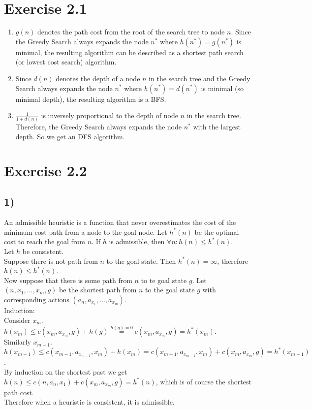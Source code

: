 \documentclass{article}
\begin{document}
\section*{Exercise 2.1}
\begin{enumerate}[label=(\alph*)]
	\item	$g(n)$ denotes the path cost from the root of the search tree to node $n$. Since the Greedy Search always expands the node $n^*$ where $h(n^*) = g(n^*)$ is minimal, the resulting algorithm can be described as a shortest path search (or lowest cost search) algorithm.
	\item	Since $d(n)$ denotes the depth of a node $n$ in the search tree and the Greedy Search always expands the node $n^*$ where $h(n^*) = d(n^*)$ is minimal (so minimal depth), the resulting algorithm is a BFS.
	\item	$\frac{1}{1+d(n)}$ is inversely proportional to the depth of node $n$ in the search tree. Therefore, the Greedy Search always expands the node $n^*$ with the largest depth. So we get an DFS algorithm.
\end{enumerate}

\section*{Exercise 2.2}
\subsection*{1)}
An admissible heuristic is a function that never overestimates the cost of the minimum cost path from a node to the goal node. Let $h^*(n)$ be the optimal cost to reach the goal from $n$. If $h$ is admissible, then $\forall n: h(n) \leq h^*(n)$.\\[2\baselineskip]
Let $h$ be consistent.\\
Suppose there is not path from $n$ to the goal state. Then $h^*(n) = \infty$, therefore $h(n) \leq h^*(n)$.\\
Now suppose that there is some path from $n$ to te goal state $g$. Let $(n, x_1, \dots, x_m, g)$ be the shortest path from $n$ to the goal state $g$ with corresponding actions $(a_n, a_{x_1}, \dots, a_{x_m})$.\\[2\baselineskip]
Induction:\\
Consider $x_m$. $h(x_m) \leq c(x_m, a_{x_m}, g) + h(g) \stackrel{h(g)=0}{=} c(x_m, a_{x_m}, g) = h^*(x_m)$.\\
Similarly $x_{m-1}$. $h(x_{m-1}) \leq c(x_{m-1}, a_{x_{m-1}}, x_m) + h(x_m) = c(x_{m-1}, a_{x_{m-1}}, x_m) + c(x_m, a_{x_m}, g) = h^*(x_{m-1})$.\\
By induction on the shortest past we get $h(n) \leq c(n, a_n, x_1)+ c(x_m, a_{x_m}, g) = h^*(n)$, which is of course the shortest path cost.\\[2\baselineskip]
Therefore when a heuristic is consistent, it is admissible.
\end{document}
